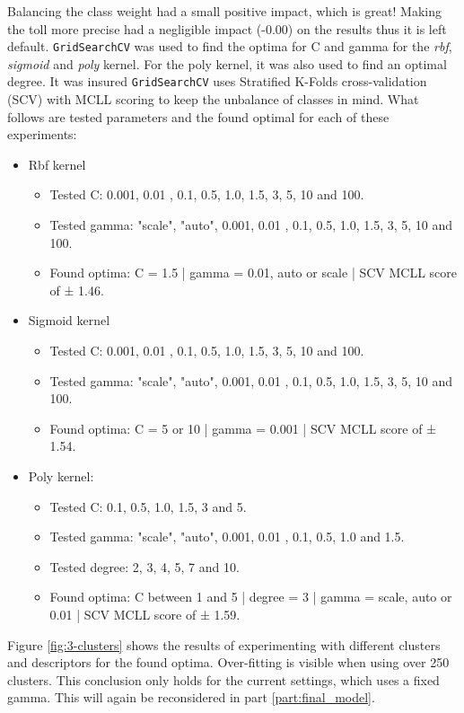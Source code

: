 Balancing the class weight had a small positive impact, which is great!
Making the toll more precise had a negligible impact (-0.00) on the results thus it is left default.
\texttt{GridSearchCV} was used to find the optima for C and gamma for the \textit{rbf}, \textit{sigmoid} and \textit{poly} kernel.
For the poly kernel, it was also used to find an optimal degree.
It was insured \texttt{GridSearchCV} uses Stratified K-Folds cross-validation (SCV) with MCLL scoring to keep the unbalance of classes in mind.
What follows are tested parameters and the found optimal for each of these experiments:
\begin{itemize}
    \item Rbf kernel
    \begin{itemize}
        \item Tested C: 0.001, 0.01 , 0.1, 0.5, 1.0, 1.5, 3, 5, 10 and 100.
        \item Tested gamma: "scale", "auto", 0.001, 0.01 , 0.1, 0.5, 1.0, 1.5, 3, 5, 10 and 100.
        \item Found optima: C = 1.5 | gamma = 0.01, auto or scale | SCV MCLL score of ± 1.46.
    \end{itemize}
    \item Sigmoid kernel
    \begin{itemize}
        \item Tested C: 0.001, 0.01 , 0.1, 0.5, 1.0, 1.5, 3, 5, 10 and 100.
        \item Tested gamma: "scale", "auto", 0.001, 0.01 , 0.1, 0.5, 1.0, 1.5, 3, 5, 10 and 100.
        \item Found optima: C = 5 or 10 | gamma = 0.001 | SCV MCLL score of ± 1.54.
    \end{itemize}
    \item Poly kernel:
    \begin{itemize}
        \item Tested C: 0.1, 0.5, 1.0, 1.5, 3 and 5.
        \item Tested gamma: "scale", "auto", 0.001, 0.01 , 0.1, 0.5, 1.0 and 1.5.
        \item Tested degree: 2, 3, 4, 5, 7 and 10.
        \item Found optima: C between 1 and 5 | degree = 3 | gamma = scale, auto or 0.01  | SCV MCLL score of ± 1.59.
    \end{itemize}
\end{itemize}

Figure \ref{fig:3-clusters} shows the results of experimenting with different clusters and descriptors for the found optima.
Over-fitting is visible when using over 250 clusters.
This conclusion only holds for the current settings, which uses a fixed gamma.
This will again be reconsidered in part \ref{part:final_model}.

